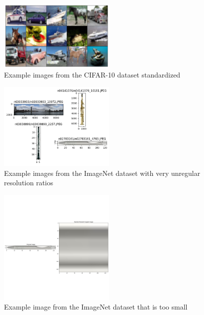     \begin{figure}
        \centering
        \includegraphics[width=0.5\textwidth]{../../sample_images/cifar_rbatch}
        \caption{Example images from the CIFAR-10 dataset standardized}
        \label{fig:cifar10_example_normalized}
    \end{figure}

    \begin{figure}
        \centering
        \includegraphics[width=0.5\textwidth]{../../sample_images/optima_shape_examples}
        \caption{Example images from the ImageNet dataset with very unregular resolution ratios}
        \label{fig:optimum_resolution}
    \end{figure}

    \begin{figure}
        \centering
        \includegraphics[width=0.5\textwidth]{../../sample_images/random_resized_crop_small}
        \caption{Example image from the ImageNet dataset that is too small}
        \label{fig:small_image}
    \end{figure}